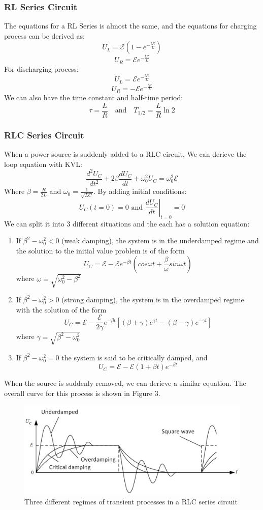\documentclass[12pt, a4paper]{article}
\begin{document}
\subsubsection{RL Series Circuit}
The equations for a RL Series is almost the same, and the equations for charging process can be derived as:
$$U_L=\mathcal{E}(1-e^{-\frac{tR}{L}})$$
$$U_R=\mathcal{E}e^{-\frac{tR}{L}} $$
For discharging process:
$$ U_L=\mathcal{E}e^{-\frac{tR}{L}} $$
$$ U_R=-\mathcal{E}e^{-\frac{tR}{L}} $$
We can also have the time constant and half-time period:
$$\tau  = \frac{L}{R}\quad\text{and}\quad T_{1/2} = \frac{L}{R}\ln2 $$

\subsubsection{RLC Series Circuit}
When a power source is suddenly added to a RLC circuit, We can derieve the loop equation with KVL:
$$\dfrac{d^2U_C}{dt^2}+2\beta\dfrac{dU_C}{dt}+\omega_0^2U_C=\omega_0^2\mathcal{E}$$
Where $\beta = \frac{R}{2L}$ and $\omega_0 = \frac{1}{\sqrt{LC}}$.
By adding initial conditions:
$$U_C(t=0)=0 \text{ and } \left.\dfrac{dU_C}{dt}\right|_{t=0}=0$$
We can split it into 3 different situations and the each has a solution equation:
\begin{enumerate}
	\item
	If $ \beta^2-\omega_0^2<0 $ (weak damping), the system is in the underdamped regime and the solution to the initial value problem is of the form
	$$ U_C=\mathcal{E}-\mathcal{E}e^{-\beta t}\left( cos\omega t+\dfrac{\beta}{\omega}sin\omega t \right) $$
	where $ \omega=\sqrt{\omega_0^2-\beta^2} $
	\item
	If $ \beta^2-\omega_0^2>0 $ (strong damping), the system is in the overdamped regime with the	solution of the form
	$$  U_C=\mathcal{E}-\dfrac{\mathcal{E}}{2\gamma}e^{-\beta t}[(\beta+\gamma)e^{\gamma t}-(\beta-\gamma)e^{-\gamma t}]  $$
	where $ \gamma=\sqrt{\beta^2-\omega_0^2} $
	\item
	If $ \beta^2-\omega_0^2=0 $ the system is said to be critically damped, and
    $$ U_C=\mathcal{E}-\mathcal{E}(1+\beta t)e^{-\beta t} $$
\end{enumerate}
When the source is suddenly removed, we can derieve a similar equation. The overall curve for this process is shown in Figure 3.
\begin{figure}[H]
	\centering
	\includegraphics[scale=0.5]{fig3.jpg}
	\caption{Three different regimes of transient processes in a RLC series circuit}
\end{figure}
\end{document}

